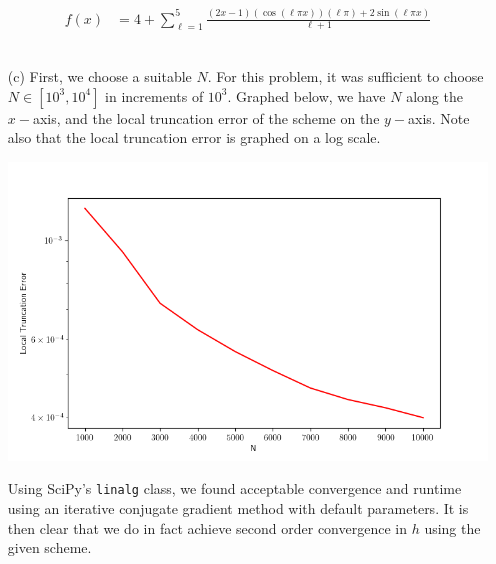 \documentclass[11pt,reqno]{amsart}
\newcommand{\code}{\texttt}
\newcommand{\an}[1]{{\leavevmode\color{BrickRed}{#1}}}
\begin{document}
\begin{itemize}
\begin{align*}
        f(x) &= 4 +\sum_{\ell=1}^5 \frac{(2x-1)(\cos(\ell \pi x))(\ell \pi)+2\sin(\ell \pi x)}{\ell + 1}
    \end{align*}\newline
    \\
    \newpage
    \item[(c)] First, we choose a suitable $N$. For this problem, it was sufficient to choose $N \in [10^3,10^4]$ in increments of $10^3$. Graphed below, we have $N$ along the $x-$axis, and the local truncation error of the scheme on the $y-$axis. Note also that the local truncation error is graphed on a log scale.

    \begin{center}
        \includegraphics[scale=.7]{Figure_1.png}
    \end{center}\newline

    \noindent Using SciPy's \code{linalg} class, we found acceptable convergence and runtime using an iterative conjugate gradient method with default parameters. It is then clear that we do in fact achieve second order convergence in $h$ using the given scheme.    
    \an{The error looks quite suboptimal here. Anyway, you should be plotting this on a log-log scale if you want to see clear second order convergence.}\\
    \an{In your code, you are doing some weird things, but the ones that stand out to me are:
    \begin{itemize}
      \item You're rounding most things to 5 or 6 decimal places. (Why?)
      \item You're using a lot of lists when you could just use numpy arrays.
      \item You're computing the LTE as a vector norm, which is fine, but the vector you're creating is not the error, but instead the error squared.
    \end{itemize}
    }
\end{itemize}
\end{document}
